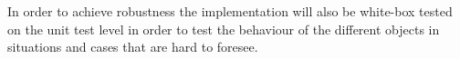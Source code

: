 In order to achieve robustness the implementation will also be white-box tested on the unit test level in order to test the behaviour of the different objects in situations and cases that are hard to foresee.






